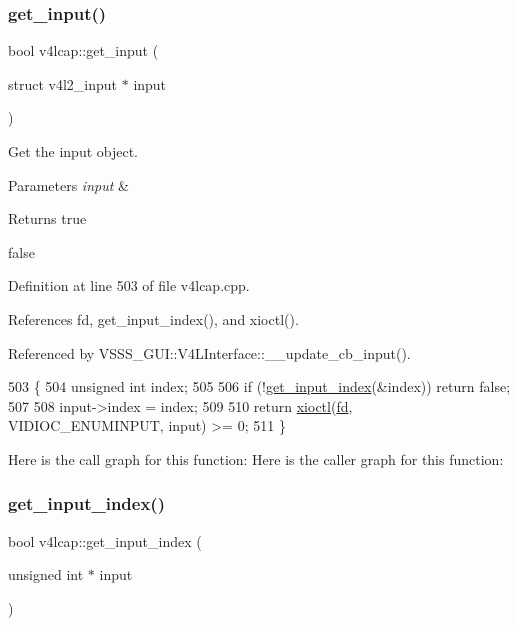 \subsubsection{\texorpdfstring{get\+\_\+input()}{get\_input()}}
{\footnotesize\ttfamily bool v4lcap\+::get\+\_\+input (\begin{DoxyParamCaption}\item[{struct v4l2\+\_\+input $\ast$}]{input }\end{DoxyParamCaption})}



Get the input object. 


\begin{DoxyParams}{Parameters}
{\em input} & \\
\hline
\end{DoxyParams}
\begin{DoxyReturn}{Returns}
true 

false 
\end{DoxyReturn}


Definition at line 503 of file v4lcap.\+cpp.



References fd, get\+\_\+input\+\_\+index(), and xioctl().



Referenced by V\+S\+S\+S\+\_\+\+G\+U\+I\+::\+V4\+L\+Interface\+::\+\_\+\+\_\+update\+\_\+cb\+\_\+input().


\begin{DoxyCode}
503                                                 \{
504     \textcolor{keywordtype}{unsigned} \textcolor{keywordtype}{int} index;
505 
506     \textcolor{keywordflow}{if} (!\hyperlink{classv4lcap_ad6cf8417903c40e86a087a236cd39337}{get\_input\_index}(&index)) \textcolor{keywordflow}{return} \textcolor{keyword}{false};
507 
508     input->index = index;
509 
510     \textcolor{keywordflow}{return} \hyperlink{classv4lcap_ab5aaa5a8c0df17f5ca57e0b5170232cb}{xioctl}(\hyperlink{classv4lcap_a38109593bde997dad13b3a461569573d}{fd}, VIDIOC\_ENUMINPUT, input) >= 0;
511 \}
\end{DoxyCode}
Here is the call graph for this function\+:
Here is the caller graph for this function\+:
\mbox{\label{classv4lcap_ad6cf8417903c40e86a087a236cd39337}} 
\subsubsection{\texorpdfstring{get\+\_\+input\+\_\+index()}{get\_input\_index()}}
{\footnotesize\ttfamily bool v4lcap\+::get\+\_\+input\+\_\+index (\begin{DoxyParamCaption}\item[{unsigned int $\ast$}]{input }\end{DoxyParamCaption})}



